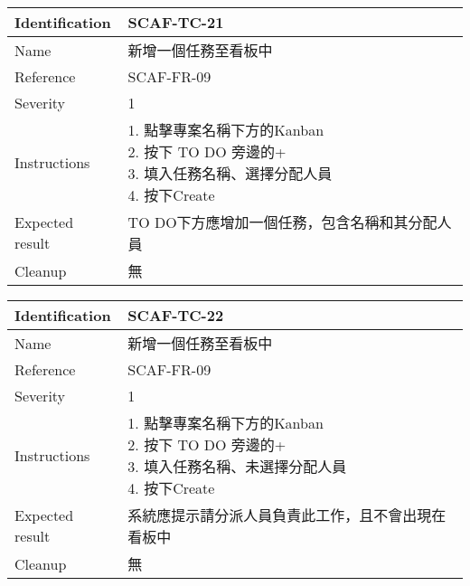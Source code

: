 \documentclass{report}
\begin{document}
\begin{tabularx}{0.9\textwidth}{
  |p{}%
  |p{}|%
  }
  \hline
  \centering Identification &  SCAF-TC-21 \\
  \hline
  \centering Name & 新增一個任務至看板中 \\
  \hline
  \centering Reference & SCAF-FR-09 \\
  \hline
  \centering Severity & 1 \\
  \hline
  \centering Instructions & 
  \makecell{
    1. 點擊專案名稱下方的Kanban  \\
    2. 按下 TO DO 旁邊的+  \\
    3. 填入任務名稱、選擇分配人員  \\
    4. 按下Create
  }\\
  \hline
  \centering Expected result & TO DO下方應增加一個任務，包含名稱和其分配人員 \\
  \hline
  \centering Cleanup & 無 \\
  \hline
\end{tabularx}
\newline\newline


\begin{tabularx}{0.9\textwidth}{
  |p{}%
  |p{}|%
  }
  \hline
  \centering Identification &  SCAF-TC-22 \\
  \hline
  \centering Name & 新增一個任務至看板中 \\
  \hline
  \centering Reference & SCAF-FR-09 \\
  \hline
  \centering Severity & 1 \\
  \hline
  \centering Instructions & 
  \makecell{
    1. 點擊專案名稱下方的Kanban  \\
    2. 按下 TO DO 旁邊的+  \\
    3. 填入任務名稱、未選擇分配人員  \\
    4. 按下Create
  }\\
  \hline
  \centering Expected result & 系統應提示請分派人員負責此工作，且不會出現在看板中 \\
  \hline
  \centering Cleanup & 無 \\
  \hline
\end{tabularx}
\newline\newline
\end{document}
